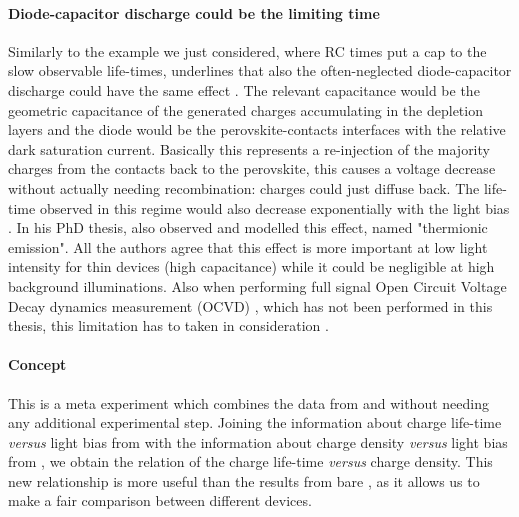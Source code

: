 		\paragraph{Diode\hyp{}capacitor discharge could be the limiting time}
		Similarly to the example we just considered, where RC times put a cap to the slow observable life\hyp{}times,  underlines that also the often-neglected diode\hyp{}capacitor discharge could have the same effect \cite{Tvingstedt2017,Hellen2003}.
		The relevant capacitance would be the geometric capacitance of the generated charges accumulating in the depletion layers and the diode would be the perovskite-contacts interfaces with the relative dark saturation current.
		Basically this represents a re\hyp{}injection of the majority charges from the contacts back to the perovskite, this causes a voltage decrease without actually needing recombination: charges could just diffuse back.
				The life\hyp{}time observed in this regime would also decrease exponentially with the light bias \cite{Castaner1981}.
				In his PhD thesis, also  observed and modelled this effect, named "thermionic emission".
				All the authors agree that this effect is more important at low light intensity for thin devices (high capacitance) \cite{Kiermasch2018} while it could be negligible at high background illuminations.
		Also when performing full signal Open Circuit Voltage Decay dynamics measurement (OCVD) \cite{Lederhandler1955,Mahan1981}, which has not been performed in this thesis, this limitation has to taken in consideration \cite{Tvingstedt2017,Pockett2017,Pockett2015,Kiermasch2018}.

		\FloatBarrier
		\newpage
		\label{characterization-tpvce}

		\paragraph{Concept}
		This is a meta experiment which combines the data from  and  without needing any additional experimental step.
		Joining the information about charge life\hyp{}time \textsl{versus} light bias from  with the information about charge density \textsl{versus} light bias from , we obtain the relation of the charge life\hyp{}time \textsl{versus} charge density.
		This new relationship is more useful than the results from bare , as it allows us to make a fair comparison between different devices.

